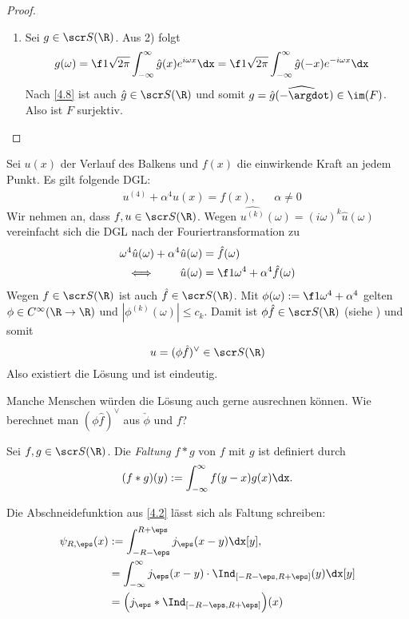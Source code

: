 \begin{st}
\begin{proof}
\begin{enumerate}[1)]
			\item
				Sei $g \in \scr S(\R)$.
				Aus 2) folgt
				\begin{align*}
					g(\omega)
					&= \f 1{\sqrt{2\pi}} \int_{-\infty}^\infty \hat g(x) e^{i\omega x} \dx
					= \f 1{\sqrt{2\pi}} \int_{-\infty}^\infty \hat g(-x) e^{-i\omega x} \dx
				\end{align*}
				Nach \ref{4.8} ist auch $\hat g \in \scr S(\R)$ und somit $g = \widehat{\hat g(- \argdot)} \in \im(F)$.
				Also ist $F$ surjektiv.
		\end{enumerate}
	\end{proof}
\end{st}

\begin{ex} \label{4.11}
	Sei $u(x)$ der Verlauf des Balkens und $f(x)$ die einwirkende Kraft an jedem Punkt.
	Es gilt folgende DGL:
	\begin{align*}
		& u^{(4)} + \alpha^4 u(x) = f(x), &
		& \alpha \neq 0
	\end{align*}
	Wir nehmen an, dass $f, u \in \scr S(\R)$.
	Wegen $\widehat{u^{(k)}}(\omega) = (i\omega)^k \hat u(\omega)$ vereinfacht sich die DGL nach der Fouriertransformation zu
	\begin{align*}
		\omega^4 \hat u(\omega) + \alpha^4 \hat u(\omega) &= \hat f(\omega) \\
		\iff \qquad  \hat u(\omega) &= \f 1{\omega^4 + \alpha^4} \hat f(\omega)
	\end{align*}
	Wegen $f \in \scr S(\R)$ ist auch $\hat f \in \scr S(\R)$.
	Mit $\phi(\omega) := \f 1{\omega^4 + \alpha^4}$ gelten $\phi \in C^\infty (\R \to \R)$ und $|\phi^{(k)}(\omega)| \le c_k$.
	Damit ist $\phi \hat f \in \scr S(\R)$ (siehe ) und somit
	\[
		u = (\phi \hat f)^{\vee} \in \scr S(\R)
	\]
	Also existiert die Lösung und ist eindeutig.

	Manche Menschen würden die Lösung auch gerne ausrechnen können.
	Wie berechnet man $(\phi \hat f)^{\vee}$ aus $\check \phi$ und $f$?
\end{ex}

\begin{df} \label{4.12}
	Sei $f, g \in \scr S(\R)$.
	Die \emph{Faltung} $f \ast g$ von $f$ mit $g$ ist definiert durch
	\[
		(f \ast g)(y) := \int_{-\infty}^\infty f(y-x) g(x) \dx.
	\]
\end{df}

\begin{ex} \label{4.13}
	Die Abschneidefunktion aus \ref{4.2} lässt sich als Faltung schreiben:
	\begin{align*}
		\psi_{R,\eps} (x)
		&:= \int_{-R-\eps}^{R+\eps} j_\eps (x-y) \dx[y], \\
		&= \int_{-\infty}^\infty j_\eps(x-y) \cdot  \Ind_{[-R-\eps,R+\eps]}(y) \dx[y] \\
		&= \Big( j_\eps \ast \Ind_{[-R-\eps, R+\eps]} \Big) (x)
	\end{align*}
\end{ex}

